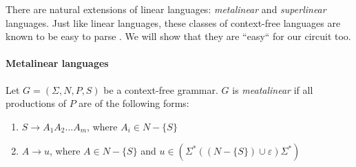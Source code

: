 There are natural extensions of linear languages: \textit{metalinear} and \textit{superlinear} languages. Just like linear languages, these classes of context-free languages are known to be easy to parse \cite{Jayaram2017ApproximatingLE}. We will show that they are ``easy`` for our circuit too.


\paragraph{Metalinear languages}

Let $G = (\Sigma, N, P, S)$ be a context-free grammar. $G$ is \textit{meatalinear} if all productions of $P$ are of the following forms:
\begin{enumerate}
\item $S \rightarrow A_1A_2...A_m$, where $A_i \in N - \{S\}$
\item $A \rightarrow u$, where $A \in N - \{S\}$ and $u \in (\Sigma^*((N-\{S\}) \cup {\varepsilon})\Sigma^*)$
\end{enumerate}



